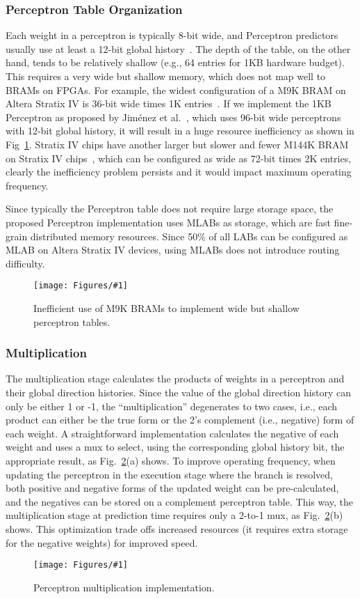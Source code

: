 \documentclass[conference]{IEEEtran}
\newcommand{\kfig}[4]{ %
        \begin{figure}[!t]
        \centering
        \texttt{[image: Figures/\#1]}
        \vspace{-1mm}
        \caption{#3}
        \label{#2}
        \end{figure}
}
\begin{document}
\subsubsection{Perceptron Table Organization}
\label{sec:fpga:perceptron:table}
Each weight in a perceptron is typically 8-bit wide, and Perceptron predictors usually use at least a 12-bit global history~\cite{perceptron}. The depth of the table, on the other hand, tends to be relatively shallow (e.g., 64 entries for 1KB hardware budget). This requires a very wide but shallow memory, which does not map well to BRAMs on FPGAs. For example, the widest configuration of a M9K BRAM on Altera Stratix IV is 36-bit wide times 1K entries~\cite{StratixIVM9K}. If we implement the 1KB Perceptron as proposed by Jim\'enez et al.~\cite{perceptron}, which uses 96-bit wide perceptrons with 12-bit global history, it will result in a huge resource inefficiency as shown in Fig~\ref{fig:perceptronTable}. Stratix IV chips have another larger but slower and fewer M144K BRAM on Stratix IV chips~\cite{StratixIVM9K}, which can be configured as wide as 72-bit times 2K entries, clearly the inefficiency problem persists and it would impact maximum operating frequency.

Since typically the Perceptron table does not require large storage space, the proposed Perceptron implementation uses MLABs as storage, which are fast fine-grain distributed memory resources. Since 50\% of all LABs can be configured as MLAB on Altera Stratix IV devices, using MLABs does not introduce routing difficulty.
\kfig{perceptronTable.pdf}{fig:perceptronTable}{Inefficient use of M9K BRAMs to implement wide but shallow perceptron tables.}{angle = 0, trim = 1in 2in 3.4in 0.6in, clip, width=0.25\textwidth}


\subsubsection{Multiplication}
\label{sec:fpga:perceptron:mult}
The multiplication stage calculates the products of weights in a perceptron and their global direction histories. Since the value of the global direction history can only be either 1 or -1, the ``multiplication'' degenerates to two cases, i.e., each product can either be the true form or the 2's complement (i.e., negative) form of each weight. A straightforward implementation calculates the negative of each weight and uses a mux to select, using the corresponding global history bit, the appropriate result, as Fig.~\ref{fig:perceptronMult}(a) shows. To improve operating frequency, when updating the perceptron in the execution stage where the branch is resolved, both positive and negative forms of the updated weight can be pre-calculated, and the negatives can be stored on a complement perceptron table. This way, the multiplication stage at prediction time requires only a 2-to-1 mux, as Fig.~\ref{fig:perceptronMult}(b) shows. This optimization trade offs increased resources (it requires extra storage for the negative weights) for improved speed.
\kfig{perceptronMult.pdf}{fig:perceptronMult}{Perceptron multiplication implementation.}{angle = 0, trim = 0.3in 2.2in 3in 0.6in, clip, width=0.3\textwidth}
\end{document}
